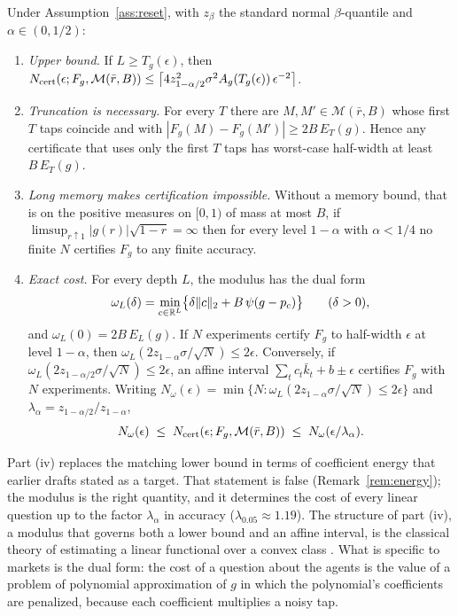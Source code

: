 \begin{theorem}\label{thm:dich}
Under Assumption~\ref{ass:reset}, with $z_\beta$ the standard normal $\beta$-quantile and $\alpha\in(0,1/2)$:
\begin{enumerate}[label=(\roman*)]
\item \emph{Upper bound.} If $L\ge T_g(\epsilon)$, then $N_{\rm cert}(\epsilon;F_g,\mathcal M(\bar r,B))\le\bigl\lceil4z_{1-\alpha/2}^2\sigma^2A_g(T_g(\epsilon))\,\epsilon^{-2}\bigr\rceil$. \hfill\Proved
\item \emph{Truncation is necessary.} For every $T$ there are $M,M'\in\mathcal M(\bar r,B)$ whose first $T$ taps coincide and with $|F_g(M)-F_g(M')|\ge2B\,E_T(g)$. Hence any certificate that uses only the first $T$ taps has worst-case half-width at least $B\,E_T(g)$. \hfill\Proved
\item \emph{Long memory makes certification impossible.} Without a memory bound, that is on the positive measures on $[0,1)$ of mass at most $B$, if $\limsup_{r\uparrow1}|g(r)|\sqrt{1-r}=\infty$ then for every level $1-\alpha$ with $\alpha<1/4$ no finite $N$ certifies $F_g$ to any finite accuracy. \hfill\Proved
\item \emph{Exact cost.} For every depth $L$, the modulus has the dual form
\[
\omega_L(\delta)=\min_{c\in\mathbb{R}^L}\bigl\{\delta\|c\|_2+B\,\psi(g-p_c)\bigr\}\qquad(\delta>0),
\]
and $\omega_L(0)=2B\,E_L(g)$. If $N$ experiments certify $F_g$ to half-width $\epsilon$ at level $1-\alpha$, then $\omega_L(2z_{1-\alpha}\sigma/\sqrt N)\le2\epsilon$. Conversely, if $\omega_L(2z_{1-\alpha/2}\sigma/\sqrt N)\le2\epsilon$, an affine interval $\sum_tc_t\bar k_t+b\pm\epsilon$ certifies $F_g$ with $N$ experiments. Writing $N_\omega(\epsilon)=\min\{N:\omega_L(2z_{1-\alpha}\sigma/\sqrt N)\le2\epsilon\}$ and $\lambda_\alpha=z_{1-\alpha/2}/z_{1-\alpha}$,
\[
N_\omega(\epsilon)\;\le\;N_{\rm cert}(\epsilon;F_g,\mathcal M(\bar r,B))\;\le\;N_\omega(\epsilon/\lambda_\alpha).
\]
\hfill\Proved
\end{enumerate}
\end{theorem}

Part (iv) replaces the matching lower bound in terms of coefficient energy that earlier drafts stated as a target. That statement is false (Remark~\ref{rem:energy}); the modulus is the right quantity, and it determines the cost of every linear question up to the factor $\lambda_\alpha$ in accuracy ($\lambda_{0.05}\approx1.19$). The structure of part (iv), a modulus that governs both a lower bound and an affine interval, is the classical theory of estimating a linear functional over a convex class \citep{t:ibragimov1984,t:donoho1994}. What is specific to markets is the dual form: the cost of a question about the agents is the value of a problem of polynomial approximation of $g$ in which the polynomial's coefficients are penalized, because each coefficient multiplies a noisy tap.

